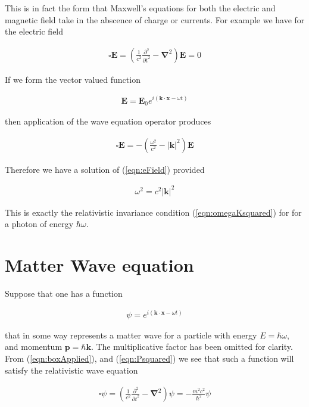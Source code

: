 \documentclass[]{eliblog}
\newcommand{\Abs}[1]{{\left\lvert{#1}\right\rvert}}
\newcommand{\BE}[0]{\mathbf{E}}
\newcommand{\Bk}[0]{\mathbf{k}}
\newcommand{\Bp}[0]{\mathbf{p}}
\newcommand{\Bx}[0]{\mathbf{x}}
\newcommand{\spacegrad}[0]{\boldsymbol{\nabla}}
\newcommand{\delambertian}[0]{\square}
\begin{document}
This is in fact the form that Maxwell's equations for both the electric and magnetic field take in the abscence of charge or currents.
For example we have for the electric field

\begin{align}\label{eqn:eField}
\delambertian \BE = \left( \frac{1}{c^2}\frac{\partial^2}{{\partial t}^2} - \spacegrad^2 \right) \BE = 0
\end{align}

If we form the vector valued function

\begin{align}\label{eqn:testSolutionE}
\BE = \BE_0 e^{ i( \Bk \cdot \Bx - \omega t ) }
\end{align}

then application of the wave equation operator produces

\begin{align}\label{eqn:boxApplied}
\delambertian \BE = -\left( \frac{\omega^2}{c^2} - \Abs{\Bk}^2 \right) \BE
\end{align}

Therefore we have a solution of (\ref{eqn:eField}) provided

\begin{align}
\omega^2 = c^2 \Abs{\Bk}^2
\end{align}

This is exactly the relativistic invariance condition (\ref{eqn:omegaKsquared}) for for a photon of energy $\hbar \omega$.

\section{Matter Wave equation}

Suppose that one has a function

\begin{align}\label{eqn:waveFunction}
\psi = e^{ i( \Bk \cdot \Bx - \omega t) }
\end{align}

that in some way represents a matter wave for a particle with energy $E = \hbar \omega$, and momentum
 $\Bp = \hbar \Bk$.  The multiplicative factor has been omitted for clarity.
From (\ref{eqn:boxApplied}), and 
(\ref{eqn:Psquared})
we see that such a function will satisfy the relativistic wave equation

\begin{align}
\delambertian \psi = \left( \frac{1}{c^2}\frac{\partial^2}{{\partial t}^2} - \spacegrad^2 \right) \psi = - \frac{m^2 c^2}{\hbar^2} \psi
\end{align}
\end{document}
